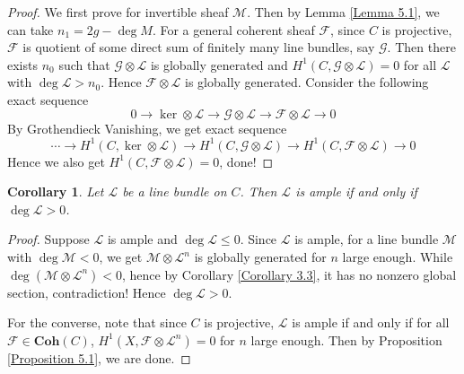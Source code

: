\documentclass{ctexart}
\newtheorem{corollary}{Corollary}[section]
\newcommand{\coherent}{\mathbf{Coh}}
\begin{document}
\begin{proof}
    We first prove for invertible sheaf $\mathcal{M}$.
    Then by Lemma \ref{Lemma 5.1}, we can take $n_{1} = 2g - \deg M$.
    For a general coherent sheaf $\mathcal{F}$, since $C$ is projective,
    $\mathcal{F}$ is quotient of some direct sum of finitely many line bundles, say $\mathcal{G}$.
    Then there exists $n_{0}$ such that $\mathcal{G} \otimes \mathcal{L}$ is globally generated and $H^{1}(C, \mathcal{G} \otimes \mathcal{L}) = 0$ for all $\mathcal{L}$ with $\deg \mathcal{L} > n_{0}$.
    Hence $\mathcal{F} \otimes \mathcal{L}$ is globally generated.
    Consider the following exact sequence
    \begin{equation}
        0 \longrightarrow \ker \otimes \mathcal{L} \longrightarrow \mathcal{G} \otimes \mathcal{L} \longrightarrow \mathcal{F} \otimes \mathcal{L} \longrightarrow 0
    \end{equation}
    By Grothendieck Vanishing, we get exact sequence
    \begin{equation}
        \cdots \longrightarrow H^{1}(C, \ker \otimes \mathcal{L}) \longrightarrow H^{1}(C, \mathcal{G} \otimes \mathcal{L}) \longrightarrow H^{1}(C, \mathcal{F} \otimes \mathcal{L}) \longrightarrow 0
    \end{equation}
    Hence we also get $H^{1}(C, \mathcal{F} \otimes \mathcal{L}) = 0$, done!
\end{proof}
\begin{corollary}
    Let $\mathcal{L}$ be a line bundle on $C$.
    Then $\mathcal{L}$ is ample if and only if $\deg \mathcal{L} > 0$.
    \label{Corollary 5.1}
\end{corollary}
\begin{proof}
    Suppose $\mathcal{L}$ is ample and $\deg \mathcal{L} \le 0$.
    Since $\mathcal{L}$ is ample, for a line bundle $\mathcal{M}$ with $\deg \mathcal{M} < 0$, 
    we get $\mathcal{M} \otimes \mathcal{L}^{n}$ is globally generated for $n$ large enough.
    While $\deg (\mathcal{M} \otimes \mathcal{L}^{n}) < 0$, hence by Corollary \ref{Corollary 3.3}, it has no nonzero global section, contradiction!
    Hence $\deg \mathcal{L} > 0$.
    \par
    For the converse, note that since $C$ is projective, 
    $\mathcal{L}$ is ample if and only if for all $\mathcal{F}\in \coherent (C)$,
    $H^{1}(X, \mathcal{F} \otimes \mathcal{L}^{n}) = 0$ for $n$ large enough.
    Then by Proposition \ref{Proposition 5.1}, we are done.
\end{proof}
\end{document}

